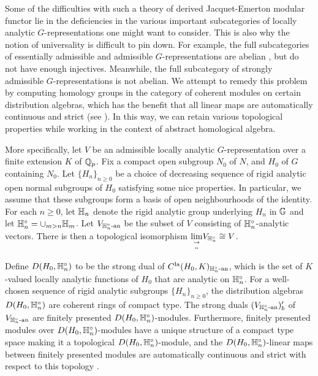 \documentclass[10pt]{amsart}
\begin{document}
Some of the difficulties with such a theory of derived Jacquet-Emerton modular functor lie in the deficiencies in the various important subcategories of locally analytic $G$-representations one might want to consider. This is also why the notion of universality is difficult to pin down. For example, the full subcategories of essentially admissible and admissible $G$-representations are abelian \cite{ST_dist}, but do not have enough injectives. Meanwhile, the full subcategory of strongly admissible $G$-representations is not abelian. We attempt to remedy this problem by computing homology groups in the category of coherent modules on certain distribution algebras, which has the benefit that all linear maps are automatically continuous and strict (see \cite[Appendix A]{Jacquet2}). In this way, we can retain various topological properties while working in the context of abstract homological algebra. 

More specifically, let $V$ be an admissible locally analytic $G$-representation over a finite extension $K$ of $\mathbb{Q}_{p}$. Fix a compact open subgroup $N_{0}$ of $N$, and $H_{0}$ of $G$ containing $N_{0}$. Let $\{H_{n}\}_{n\geq 0}$ be a choice of decreasing sequence of rigid analytic open normal subgroups of $H_{0}$ satisfying some nice properties. In particular, we assume that these subgroups form a basis of open neighbourhoods of the identity. For each $n\geq 0$, let $\mathbb{H}_{n}$ denote the rigid analytic group underlying $H_{n}$ in $\mathbb{G}$ and let $\mathbb{H}_{n}^{\circ}=\cup_{m>n}\mathbb{H}_{m}$. Let $V_{\mathbb{H}_{n}^{\circ}\textnormal{-an}}$ be the subset of $V$ consisting of $\mathbb{H}_{n}^{\circ}$-analytic vectors. There is then a topological isomorphism $\underset{\underset{n}{\rightarrow}}{\lim} V_{\mathbb{H}_{n}^{\circ}}\cong V$. 

Define $D(H_{0},\mathbb{H}_{n}^{\circ})$ to be the strong dual of $C^{\textnormal{la}}(H_{0},K)_{\mathbb{H}_{n}^{\circ}\textnormal{-an}}$, which is the set of $K$-valued locally analytic functions of $H_{0}$ that are analytic on $\mathbb{H}_{n}^{\circ}$. For a well-chosen sequence of rigid analytic subgroups $\{H_{n}\}_{n\geq 0}$, the distribution algebras $D(H_{0},\mathbb{H}_{n}^{\circ})$ are coherent rings of compact type. The strong duals $(V_{\mathbb{H}_{n}^{\circ}\textnormal{-an}})^{\prime}_{b}$ of $V_{\mathbb{H}_{n}^{\circ}\textnormal{-an}}$ are finitely presented $D(H_{0},\mathbb{H}_{n}^{\circ})$-modules. Furthermore, finitely presented modules over $D(H_{0},\mathbb{H}_{n}^{\circ})$-modules have a unique structure of a compact type space making it a topological $D(H_{0},\mathbb{H}_{n}^{\circ})$-module, and the $D(H_{0},\mathbb{H}_{n}^{\circ})$-linear maps between finitely presented modules are automatically continuous and strict with respect to this topology \cite[Prop. A.10]{Jacquet2}. 
\end{document}
